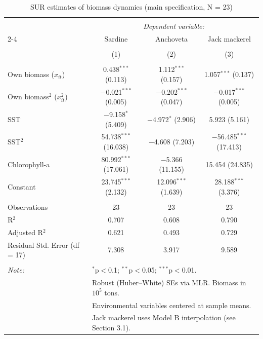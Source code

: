 \documentclass[
  11pt,
]{article}
\begin{document}
\begin{table}[!htbp] \centering 
  \caption{SUR estimates of biomass dynamics (main specification, N = 23)} 
  \label{tab:SUR_results} 
\footnotesize 
\begin{tabular}{@{\extracolsep{5pt}}lccc} 
\\[-1.8ex]\hline 
\hline \\[-1.8ex] 
 & \multicolumn{3}{c}{\textit{Dependent variable:}} \\ 
\cline{2-4} 
 & Sardine & Anchoveta & Jack mackerel \\ 
\\[-1.8ex] & (1) & (2) & (3)\\ 
\hline \\[-1.8ex] 
 Own biomass ($x_{it}$) & 0.438$^{***}$ (0.113) & 1.112$^{***}$ (0.157) & 1.057$^{***}$ (0.137) \\ 
  Own biomass$^2$ ($x_{it}^2$) & $-$0.021$^{***}$ (0.005) & $-$0.202$^{***}$ (0.047) & $-$0.017$^{***}$ (0.005) \\ 
  SST & $-$9.158$^{*}$ (5.409) & $-$4.972$^{*}$ (2.906) & 5.923 (5.161) \\ 
  SST$^2$ & 54.738$^{***}$ (16.038) & $-$4.608 (7.203) & $-$56.485$^{***}$ (17.413) \\ 
  Chlorophyll-a & 80.992$^{***}$ (17.061) & $-$5.366 (11.155) & 15.454 (24.835) \\ 
  Constant & 23.745$^{***}$ (2.132) & 12.096$^{***}$ (1.639) & 28.188$^{***}$ (3.376) \\ 
 \hline \\[-1.8ex] 
Observations & 23 & 23 & 23 \\ 
R$^{2}$ & 0.707 & 0.608 & 0.790 \\ 
Adjusted R$^{2}$ & 0.621 & 0.493 & 0.729 \\ 
Residual Std. Error (df = 17) & 7.308 & 3.917 & 9.589 \\ 
\hline 
\hline \\[-1.8ex] 
\textit{Note:}  & \multicolumn{3}{l}{$^{*}$p$<$0.1; $^{**}$p$<$0.05; $^{***}$p$<$0.01.} \\ 
 & \multicolumn{3}{l}{Robust (Huber--White) SEs via MLR. Biomass in $10^5$ tons.} \\ 
 & \multicolumn{3}{l}{Environmental variables centered at sample means.} \\ 
 & \multicolumn{3}{l}{Jack mackerel uses Model B interpolation (see Section 3.1).} \\ 
\end{tabular} 
\end{table}
\end{document}
